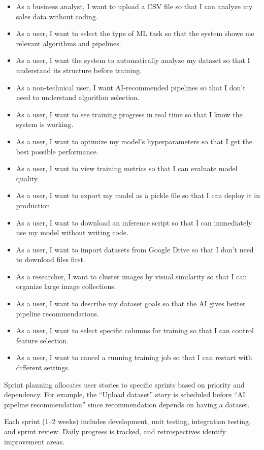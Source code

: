 \documentclass[12pt,a4paper]{report}
\begin{document}
\begin{itemize}
\item As a business analyst, I want to upload a CSV file so that I can analyze my sales data without coding.
\item As a user, I want to select the type of ML task so that the system shows me relevant algorithms and pipelines.
\item As a user, I want the system to automatically analyze my dataset so that I understand its structure before training.
\item As a non-technical user, I want AI-recommended pipelines so that I don't need to understand algorithm selection.
\item As a user, I want to see training progress in real time so that I know the system is working.
\item As a user, I want to optimize my model's hyperparameters so that I get the best possible performance.
\item As a user, I want to view training metrics so that I can evaluate model quality.
\item As a user, I want to export my model as a pickle file so that I can deploy it in production.
\item As a user, I want to download an inference script so that I can immediately use my model without writing code.
\item As a user, I want to import datasets from Google Drive so that I don't need to download files first.
\item As a researcher, I want to cluster images by visual similarity so that I can organize large image collections.
\item As a user, I want to describe my dataset goals so that the AI gives better pipeline recommendations.
\item As a user, I want to select specific columns for training so that I can control feature selection.
\item As a user, I want to cancel a running training job so that I can restart with different settings.
\end{itemize}

Sprint planning allocates user stories to specific sprints based on priority and dependency. For example, the ``Upload dataset'' story is scheduled before ``AI pipeline recommendation'' since recommendation depends on having a dataset.

Each sprint (1--2 weeks) includes development, unit testing, integration testing, and sprint review. Daily progress is tracked, and retrospectives identify improvement areas.
\end{document}
